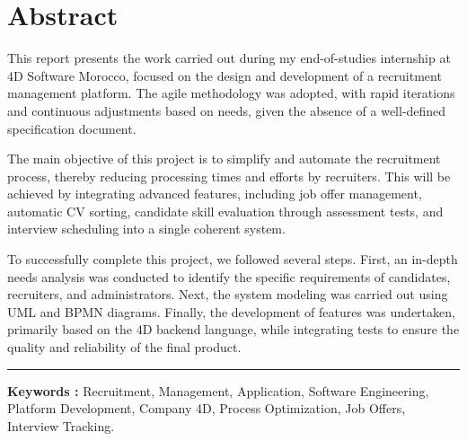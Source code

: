 \chapter*{Abstract}

This report presents the work carried out during my end-of-studies internship at 4D Software Morocco, focused on the design and development of a recruitment management platform. The agile methodology was adopted, with rapid iterations and continuous adjustments based on needs, given the absence of a well-defined specification document.
\newline

The main objective of this project is to simplify and automate the recruitment process, thereby reducing processing times and efforts by recruiters. This will be achieved by integrating advanced features, including job offer management, automatic CV sorting, candidate skill evaluation through assessment tests, and interview scheduling into a single coherent system.
\newline

To successfully complete this project, we followed several steps. First, an in-depth needs analysis was conducted to identify the specific requirements of candidates, recruiters, and administrators. Next, the system modeling was carried out using UML and BPMN diagrams. Finally, the development of features was undertaken, primarily based on the 4D backend language, while integrating tests to ensure the quality and reliability of the final product.
\newline


\vspace{1cm}
\noindent\rule[2pt]{\textwidth}{0.5pt}
\textbf{Keywords :} Recruitment, Management, Application, Software Engineering, Platform Development, Company 4D, Process Optimization, Job Offers, Interview Tracking.

